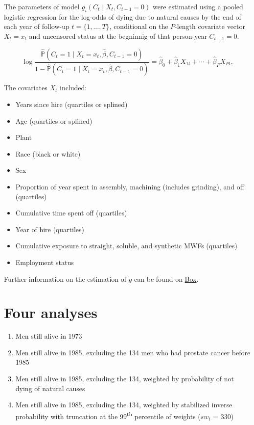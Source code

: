 \documentclass[10pt,]{article}
\providecommand{\tightlist}{%
  \setlength{\itemsep}{0pt}\setlength{\parskip}{0pt}}
\begin{document}
The parameters of model \(g_i(C_t \mid X_t, C_{t - 1} = 0)\) were
estimated using a pooled logistic regression for the log-odds of dying
due to natural causes by the end of each year of follow-up
\(t = \{1, \dots, T\}\), conditional on the \(P\)-length covariate
vector \(X_t = x_t\) and uncensored status at the begninnig of that
person-year \(C_{t - 1} = 0\).

\[\log\frac{\widehat{\mathbb P}\left(C_{t} = 1 \mid X_{t} = x_t, \hat{\beta}, C_{t - 1} = 0\right)}{1 - \widehat{\mathbb P}\left(C_{t} = 1 \mid X_{t} = x_t, \hat{\beta}, C_{t - 1} = 0\right)}
= \hat{\beta}_{0} + \hat{\beta}_1 X_{1t} +  \cdots + \hat{\beta}_P X_{Pt}.\]

The covariates \(X_t\) included:

\begin{itemize}
\tightlist
\item
  Years since hire (quartiles or splined)
\item
  Age (quartiles or splined)
\item
  Plant
\item
  Race (black or white)
\item
  Sex
\item
  Proportion of year spent in assembly, machining (includes grinding),
  and off (quartiles)
\item
  Cumulative time spent off (quartiles)
\item
  Year of hire (quartiles)
\item
  Cumulative exposure to straight, soluble, and synthetic MWFs
  (quartiles)
\item
  Employment status
\end{itemize}

Further information on the estimation of \(g\) can be found on
\href{https://berkeley.app.box.com/folder/114285681411}{Box}.

\hypertarget{four-analyses}{%
\section{Four analyses}\label{four-analyses}}

\begin{enumerate}
\def\labelenumi{\arabic{enumi}.}
\tightlist
\item
  Men still alive in 1973
\item
  Men still alive in 1985, excluding the 134 men who had prostate cancer
  before 1985
\item
  Men still alive in 1985, excluding the 134, weighted by probability of
  not dying of natural causes
\item
  Men still alive in 1985, excluding the 134, weighted by stabilized
  inverse probability with truncation at the 99\textsuperscript{th}
  percentile of weights (\(sw_i\) = 330)
\end{enumerate}
\end{document}
